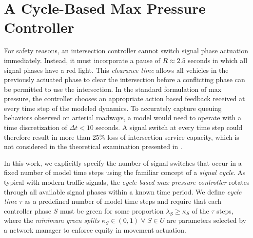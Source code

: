\section{A Cycle-Based Max Pressure Controller} 
For safety reasons, an intersection controller cannot switch signal phase actuation immediately. Instead, it must incorporate a pause of $R\approx2.5$ seconds in which all signal phases have a red light. This \emph{clearance time} allows all vehicles in the previously actuated phase to clear the intersection before a conflicting phase can be permitted to use the intersection. In the standard formulation of max pressure, the controller chooses an appropriate action based feedback received at every time step of the modeled dynamics. To accurately capture queuing behaviors observed on arterial roadways, a model would need to operate with a time discretization of $\Delta t< 10$ seconds. A signal switch at every time step could therefore result in more than 25\% loss of intersection service capacity, which is not considered in the theoretical examination presented in \cite{Varaiya2013}. 

In this work, we explicitly specify the number of signal switches that occur in a fixed number of model time steps using the familiar concept of a \emph{signal cycle}. As typical with modern traffic signals, the \emph{cycle-based max pressure controller} rotates through all available signal phases within a known time period. We define \emph{cycle time} $\tau$ as a predefined number of model time steps and require that each controller phase $S$ must be green for some proportion $\lambda_S \geq \kappa_S$ of the $\tau$ steps, where the \emph{minimum green splits} $\kappa_S \in (0,1) \; \forall \; S \in U $ are parameters selected by a network manager to enforce equity in movement actuation.  

